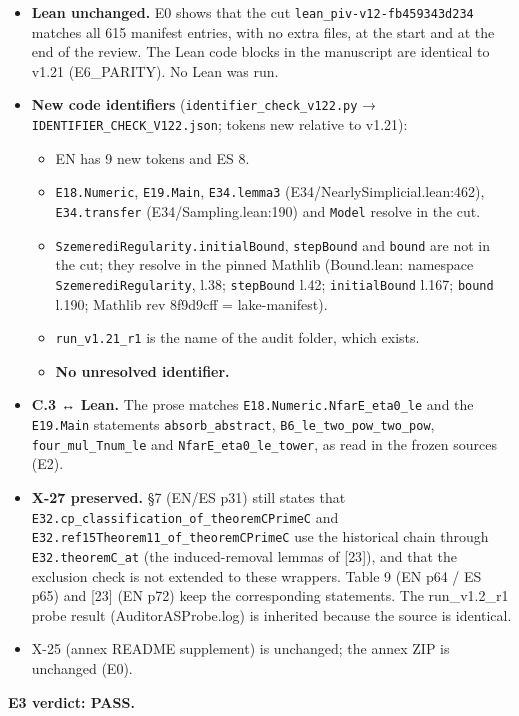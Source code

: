 \documentclass[
]{article}
\providecommand{\tightlist}{%
  \setlength{\itemsep}{0pt}\setlength{\parskip}{0pt}}
\begin{document}
\begin{itemize}
\tightlist
\item
  \textbf{Lean unchanged.} E0 shows that the cut
  \texttt{lean\_piv-v12-fb459343d234} matches all 615 manifest entries,
  with no extra files, at the start and at the end of the review. The
  Lean code blocks in the manuscript are identical to v1.21
  (E6\_PARITY). No Lean was run.
\item
  \textbf{New code identifiers} (\texttt{identifier\_check\_v122.py} →
  \texttt{IDENTIFIER\_CHECK\_V122.json}; tokens new relative to v1.21):

  \begin{itemize}
  \tightlist
  \item
    EN has 9 new tokens and ES 8.
  \item
    \texttt{E18.Numeric}, \texttt{E19.Main}, \texttt{E34.lemma3}
    (E34/NearlySimplicial.lean:462), \texttt{E34.transfer}
    (E34/Sampling.lean:190) and \texttt{Model} resolve in the cut.
  \item
    \texttt{SzemerediRegularity.initialBound}, \texttt{stepBound} and
    \texttt{bound} are not in the cut; they resolve in the pinned
    Mathlib (Bound.lean: namespace \texttt{SzemerediRegularity}, l.38;
    \texttt{stepBound} l.42; \texttt{initialBound} l.167; \texttt{bound}
    l.190; Mathlib rev 8f9d9cff = lake-manifest).
  \item
    \texttt{run\_v1.21\_r1} is the name of the audit folder, which
    exists.
  \item
    \textbf{No unresolved identifier.}
  \end{itemize}
\item
  \textbf{C.3 ↔ Lean.} The prose matches
  \texttt{E18.Numeric.NfarE\_eta0\_le} and the \texttt{E19.Main}
  statements \texttt{absorb\_abstract},
  \texttt{B6\_le\_two\_pow\_two\_pow}, \texttt{four\_mul\_Tnum\_le} and
  \texttt{NfarE\_eta0\_le\_tower}, as read in the frozen sources (E2).
\item
  \textbf{X-27 preserved.} §7 (EN/ES p31) still states that
  \texttt{E32.cp\_classification\_of\_theoremCPrimeC} and
  \texttt{E32.ref15Theorem11\_of\_theoremCPrimeC} use the historical
  chain through \texttt{E32.theoremC\_at} (the induced-removal lemmas of
  {[}23{]}), and that the exclusion check is not extended to these
  wrappers. Table 9 (EN p64 / ES p65) and {[}23{]} (EN p72) keep the
  corresponding statements. The run\_v1.2\_r1 probe result
  (AuditorASProbe.log) is inherited because the source is identical.
\item
  X-25 (annex README supplement) is unchanged; the annex ZIP is
  unchanged (E0).
\end{itemize}

\textbf{E3 verdict: PASS.}
\end{document}
